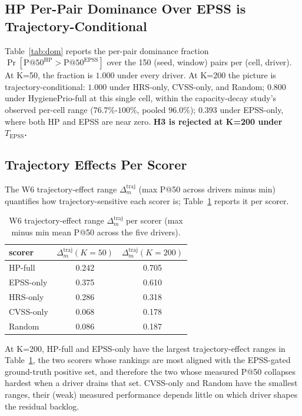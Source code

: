 \subsection{HP Per-Pair Dominance Over EPSS is Trajectory-Conditional}



Table~\ref{tab:dom} reports the per-pair dominance fraction
$\Pr[\mathrm{P@50}^{\mathrm{HP}} > \mathrm{P@50}^{\mathrm{EPSS}}]$ over
the 150 (seed, window) pairs per (cell, driver). At K=50, the fraction
is $1.000$ under every driver. At K=200 the picture is
trajectory-conditional: $1.000$ under HRS-only, CVSS-only, and Random;
$0.800$ under HygienePrio-full at this single cell, within the capacity-decay study's
observed per-cell range ($76.7\%$-$100\%$, pooled $96.0\%$);
$0.393$ under EPSS-only, where both HP and EPSS are near zero.
\textbf{H3 is rejected at K=200 under $T_{\mathrm{EPSS}}$.}

\subsection{Trajectory Effects Per Scorer}

The W6 trajectory-effect range $\Delta^{\mathrm{traj}}_m$
(max P@50 across drivers minus min) quantifies how trajectory-sensitive
each scorer is; Table~\ref{tab:trajeffect} reports it per scorer.

\begin{table}[!t]
\caption{W6 trajectory-effect range $\Delta^{\mathrm{traj}}_m$ per
scorer (max minus min mean P@50 across the five drivers).}
\label{tab:trajeffect}
\centering
\small
\begin{tabular}{lcc}
\toprule
scorer & $\Delta^{\mathrm{traj}}_m(K=50)$ & $\Delta^{\mathrm{traj}}_m(K=200)$ \\
\midrule
HP-full & 0.242 & 0.705 \\
EPSS-only & 0.375 & 0.610 \\
HRS-only & 0.286 & 0.318 \\
CVSS-only & 0.068 & 0.178 \\
Random & 0.086 & 0.187 \\
\bottomrule
\end{tabular}
\end{table}

At K=200, HP-full and EPSS-only have the largest trajectory-effect
ranges in Table~\ref{tab:trajeffect}, the two scorers whose
rankings are most aligned with the EPSS-gated ground-truth positive
set, and therefore the two whose measured P@50 collapses hardest when
a driver drains that set. CVSS-only and Random have the smallest
ranges, their (weak) measured performance depends little on which
driver shapes the residual backlog.

